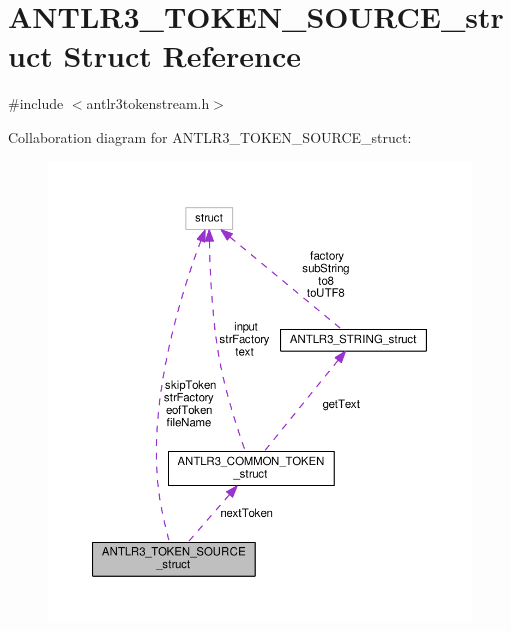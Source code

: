 \hypertarget{struct_a_n_t_l_r3___t_o_k_e_n___s_o_u_r_c_e__struct}{\section{A\-N\-T\-L\-R3\-\_\-\-T\-O\-K\-E\-N\-\_\-\-S\-O\-U\-R\-C\-E\-\_\-struct Struct Reference}
\label{struct_a_n_t_l_r3___t_o_k_e_n___s_o_u_r_c_e__struct}
}


{\ttfamily \#include $<$antlr3tokenstream.\-h$>$}



Collaboration diagram for A\-N\-T\-L\-R3\-\_\-\-T\-O\-K\-E\-N\-\_\-\-S\-O\-U\-R\-C\-E\-\_\-struct\-:
\nopagebreak
\begin{figure}[H]
\begin{center}
\leavevmode
\includegraphics[width=350pt]{struct_a_n_t_l_r3___t_o_k_e_n___s_o_u_r_c_e__struct__coll__graph}
\end{center}
\end{figure}
